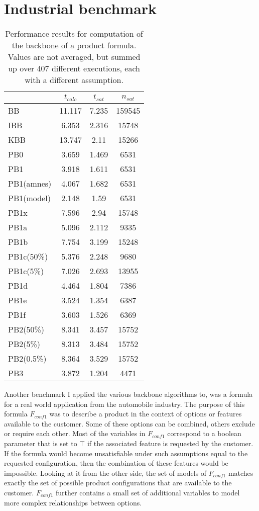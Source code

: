 \section{Industrial benchmark}
\label{sec:sectionVonThore}

\begin{wraptable}[29]{r}{7cm}
\begin{tabular}{l| c c c }
&$t_{calc}$ & $t_{sat}$& $n_{sat}$ \\
\hline
BB & 11.117 & 7.235 & 159545 \\
IBB & 6.353 & 2.316 & 15748 \\
KBB & 13.747 & 2.11 & 15266 \\
PB0 & 3.659 & 1.469 & 6531 \\
PB1 & 3.918 & 1.611 & 6531 \\
PB1(amnes) & 4.067 & 1.682 & 6531 \\
PB1(model) & 2.148 & 1.59 & 6531 \\
PB1x & 7.596 & 2.94 & 15748 \\
PB1a & 5.096 & 2.112 & 9335 \\
PB1b & 7.754 & 3.199 & 15248 \\
PB1c(50\%) & 5.376 & 2.248 & 9680 \\
PB1c(5\%) & 7.026 & 2.693 & 13955 \\
PB1d & 4.464 & 1.804 & 7386 \\
PB1e & 3.524 & 1.354 & 6387 \\
PB1f & 3.603 & 1.526 & 6369 \\
PB2(50\%) & 8.341 & 3.457 & 15752 \\
PB2(5\%) & 8.313 & 3.484 & 15752 \\
PB2(0.5\%) & 8.364 & 3.529 & 15752 \\
PB3 & 3.872 & 1.204 & 4471 \\
\end{tabular}
\caption{Performance results for computation of the backbone of a product formula. Values are not averaged, but summed up over 407 different executions, each with a different assumption.}
\label{tab:vonThore1}
\end{wraptable}

Another benchmark I applied the various backbone algorithms to, was a formula for a real world application from the automobile industry. The purpose of this formula $F_{conf1}$ was to describe a product in the context of options or features available to the customer. Some of these options can be combined, others exclude or require each other. Most of the variables in $F_{conf1}$ correspond to a boolean parameter that is set to $\top$ if the associated feature is requested by the customer. If the formula would become unsatisfiable under such assumptions equal to the requested configuration, then the combination of these features would be impossible. Looking at it from the other side, the set of models of $F_{conf1}$ matches exactly the set of possible product configurations that are available to the customer. $F_{conf1}$ further contains a small set of additional variables to model more complex relationships between options.

